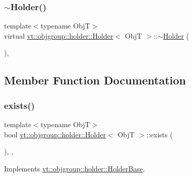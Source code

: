 \subsubsection{\texorpdfstring{$\sim$\+Holder()}{~Holder()}}
{\footnotesize\ttfamily template$<$typename ObjT$>$ \\
virtual \hyperlink{structvt_1_1objgroup_1_1holder_1_1_holder}{vt\+::objgroup\+::holder\+::\+Holder}$<$ ObjT $>$\+::$\sim$\hyperlink{structvt_1_1objgroup_1_1holder_1_1_holder}{Holder} (\begin{DoxyParamCaption}{ }\end{DoxyParamCaption})\hspace{0.3cm}{\ttfamily [virtual]}, {\ttfamily [default]}}



\subsection{Member Function Documentation}
\mbox{\label{structvt_1_1objgroup_1_1holder_1_1_holder_a0c18e5f4287e37e6a89a72df90e68273}} 
\subsubsection{\texorpdfstring{exists()}{exists()}}
{\footnotesize\ttfamily template$<$typename ObjT$>$ \\
bool \hyperlink{structvt_1_1objgroup_1_1holder_1_1_holder}{vt\+::objgroup\+::holder\+::\+Holder}$<$ ObjT $>$\+::exists (\begin{DoxyParamCaption}{ }\end{DoxyParamCaption})\hspace{0.3cm}{\ttfamily [inline]}, {\ttfamily [override]}, {\ttfamily [virtual]}}



Implements \hyperlink{structvt_1_1objgroup_1_1holder_1_1_holder_base_afeebbe358baf0b2bfea57f52807be564}{vt\+::objgroup\+::holder\+::\+Holder\+Base}.

\mbox{\label{structvt_1_1objgroup_1_1holder_1_1_holder_afa4ab0b8ce4108ad94f602772697c25d}} 
